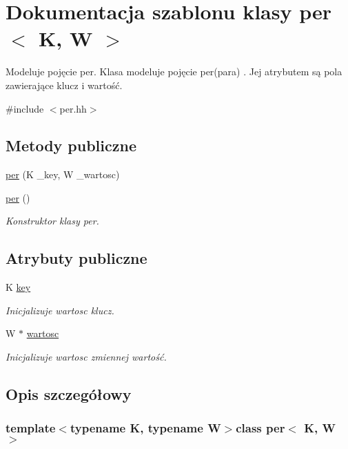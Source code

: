 \hypertarget{classper}{\section{Dokumentacja szablonu klasy per$<$ K, W $>$}
\label{classper}
}


Modeluje pojęcie per. Klasa modeluje pojęcie per(para) . Jej atrybutem są pola zawierające klucz i wartość.  




{\ttfamily \#include $<$per.\-hh$>$}

\subsection*{Metody publiczne}
\begin{DoxyCompactItemize}
\item 
\hyperlink{classper_a73013b168f465e358ce0371a730a0bfa}{per} (K \-\_\-key, W \-\_\-wartosc)
\item 
\hyperlink{classper_a15a9c5b538d2c25c8b2492f0acfbba89}{per} ()
\begin{DoxyCompactList}\small\item\em Konstruktor klasy per. \end{DoxyCompactList}\end{DoxyCompactItemize}
\subsection*{Atrybuty publiczne}
\begin{DoxyCompactItemize}
\item 
K \hyperlink{classper_a33ecddc68cd15fc35c4f7487b4f2705d}{key}
\begin{DoxyCompactList}\small\item\em Inicjalizuje wartosc klucz. \end{DoxyCompactList}\item 
W $\ast$ \hyperlink{classper_a226a74072ab3ff12f6c31e27190762a0}{wartosc}
\begin{DoxyCompactList}\small\item\em Inicjalizuje wartosc zmiennej wartość. \end{DoxyCompactList}\end{DoxyCompactItemize}


\subsection{Opis szczegółowy}
\subsubsection*{template$<$typename K, typename W$>$class per$<$ K, W $>$}



